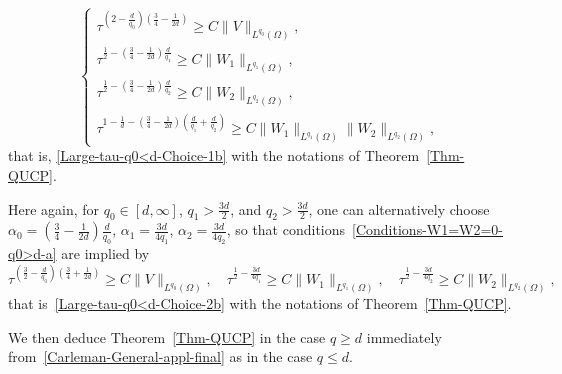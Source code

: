 \documentclass[AHL,Unicode,longabstracts]{cedram}
\newcommand*\ds{\displaystyle}
\renewcommand{\leq}{\leqslant}
\renewcommand{\geq}{\geqslant}
\begin{document}
\begin{equation}\label{Large-tau-q0>d-Choice-1}
\left\{
\begin{array}{l}
\ds \tau^{\left(2 - \frac{d}{q_0}\right) \left(\frac{3}{4}-\frac{1}{2d}\right)} \geq C \|V \|_{L^{q_0}(\Omega)},
\\[0.15em]
\ds
\tau^{\frac{1}{2} - \left(\frac{3}{4} - \frac{1}{2d}\right)\frac{d}{q_1}} \geq C \| W_{1} \|_{L^{q_1}(\Omega)},
\\
\tau^{\frac{1}{2} - \left(\frac{3}{4} - \frac{1}{2d}\right)\frac{d}{q_2}} \geq C \| W_{2} \|_{L^{q_2}(\Omega)},
\\[0.15em]
\ds \tau^{1-\frac{1}{d} - \left(\frac{3}{4} - \frac{1}{2d}\right)\left(\frac{d}{q_1} + \frac{d}{q_2}\right)} \geq C \| W_{1} \|_{L^{q_1}(\Omega)} \| W_{2} \|_{L^{q_2}(\Omega)},
\end{array}\right.
\end{equation}
that is, \eqref{Large-tau-q0<d-Choice-1b} with the notations of Theorem~\ref{Thm-QUCP}.

Here again, for $q_0 \in [d,\infty]$, $q_1 > \frac{3d}{2} $, and $q_2 > \frac{3d}{2} $, one can alternatively choose $\alpha_0 = (\frac{3}{4} - \frac{1}{2d})\frac{d}{q_0}$, $\alpha_1 = \frac{3d}{4q_1}$, $\alpha_2 = \frac{3d}{4q_2}$, so that conditions~\eqref{Conditions-W1=W2=0-q0>d-a} are implied by
\begin{equation*}
\tau^{\left(\frac{3}{2} - \frac{d}{q_0}\right) \left(\frac{3}{4}+\frac{1}{2d}\right)} \geq C \|V \|_{L^{q_0}(\Omega)},
\quad \tau^{\frac{1}{2} - \frac{3d}{4q_1}} \geq C \| W_{1} \|_{L^{q_1}(\Omega)},
\quad
\tau^{\frac{1}{2} - \frac{3d}{4q_2}} \geq C \| W_{2} \|_{L^{q_2}(\Omega)},\label{Large-tau-q0>d-Choice-2}
\end{equation*}
that is~\eqref{Large-tau-q0<d-Choice-2b} with the notations of Theorem~\ref{Thm-QUCP}.

We then deduce Theorem~\ref{Thm-QUCP} in the case $q\geq d$ immediately from~\eqref{Carleman-General-appl-final} as in the case $q \leq d$.
\end{document}
